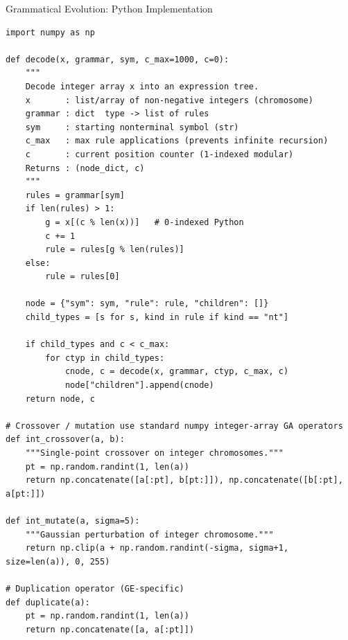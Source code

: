 \documentclass[aspectratio=169,10pt]{beamer}
\begin{document}
\begin{frame}[fragile]{Grammatical Evolution: Python Implementation}
\begin{lstlisting}[style=python]
import numpy as np

def decode(x, grammar, sym, c_max=1000, c=0):
    """
    Decode integer array x into an expression tree.
    x       : list/array of non-negative integers (chromosome)
    grammar : dict  type -> list of rules
    sym     : starting nonterminal symbol (str)
    c_max   : max rule applications (prevents infinite recursion)
    c       : current position counter (1-indexed modular)
    Returns : (node_dict, c)
    """
    rules = grammar[sym]
    if len(rules) > 1:
        g = x[(c % len(x))]   # 0-indexed Python
        c += 1
        rule = rules[g % len(rules)]
    else:
        rule = rules[0]

    node = {"sym": sym, "rule": rule, "children": []}
    child_types = [s for s, kind in rule if kind == "nt"]

    if child_types and c < c_max:
        for ctyp in child_types:
            cnode, c = decode(x, grammar, ctyp, c_max, c)
            node["children"].append(cnode)
    return node, c

# Crossover / mutation use standard numpy integer-array GA operators
def int_crossover(a, b):
    """Single-point crossover on integer chromosomes."""
    pt = np.random.randint(1, len(a))
    return np.concatenate([a[:pt], b[pt:]]), np.concatenate([b[:pt], a[pt:]])

def int_mutate(a, sigma=5):
    """Gaussian perturbation of integer chromosome."""
    return np.clip(a + np.random.randint(-sigma, sigma+1, size=len(a)), 0, 255)

# Duplication operator (GE-specific)
def duplicate(a):
    pt = np.random.randint(1, len(a))
    return np.concatenate([a, a[:pt]])
\end{lstlisting}
\end{frame}
\end{document}
